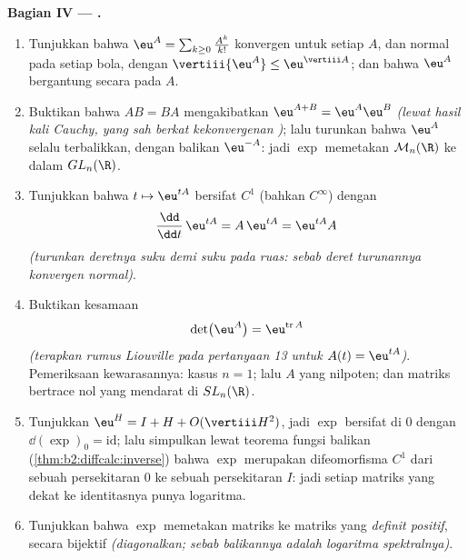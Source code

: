 \begin{problem}
\medskip
\noindent\textbf{Bagian IV --- .}
\begin{enumerate}[resume]
  \item Tunjukkan bahwa $\eu^A = \sum_{k\geq0}\frac{A^k}{k!}$
        konvergen  untuk setiap $A$, dan normal pada setiap
        bola, dengan $\vertiii{\eu^A} \leq
        \eu^{\vertiii A}$; dan bahwa $\eu^A$ bergantung
        secara  pada $A$.
  \item Buktikan bahwa $AB = BA$ mengakibatkan $\eu^{A+B} =
        \eu^A\eu^B$ \emph{(lewat hasil kali Cauchy, yang sah berkat
        kekonvergenan )}; lalu turunkan bahwa $\eu^A$ selalu
        terbalikkan, dengan balikan $\eu^{-A}$: jadi $\exp$ memetakan
        $\mathcal M_n(\R)$ ke dalam $GL_n(\R)$.
  \item Tunjukkan bahwa $t \mapsto \eu^{tA}$ bersifat $C^1$ (bahkan
        $C^\infty$) dengan
        \[
        \frac{\dd}{\dd t}\,\eu^{tA} = A\,\eu^{tA} =
        \eu^{tA}A
        \]
        \emph{(turunkan deretnya suku demi suku pada ruas:
        sebab deret turunannya konvergen normal)}.
  \item Buktikan kesamaan
        \[
        \det\bigl(\eu^{A}\bigr) = \eu^{\operatorname{tr}A}
        \]
        \emph{(terapkan rumus Liouville pada pertanyaan 13 untuk
        $A(t) = \eu^{tA}$)}. Pemeriksaan kewarasannya: kasus $n = 1$; lalu
        $A$ yang nilpoten; dan matriks bertrace nol yang mendarat di
        $SL_n(\R)$.
  \item Tunjukkan $\eu^H = I + H + O(\vertiii H^2)$, jadi $\exp$ bersifat
         di $0$ dengan $\dd(\exp)_0 =
        \mathrm{id}$; lalu simpulkan lewat teorema fungsi
        balikan (\cref{thm:b2:diffcalc:inverse}) bahwa $\exp$
        merupakan difeomorfisma $C^1$ dari sebuah persekitaran $0$
        ke sebuah persekitaran $I$: jadi setiap matriks yang dekat ke
        identitasnya punya logaritma.
  \item Tunjukkan bahwa $\exp$ memetakan matriks  ke matriks
         yang \emph{definit positif}, secara bijektif
        \emph{(diagonalkan; sebab balikannya adalah logaritma
        spektralnya)}.
\end{enumerate}


\end{problem}
